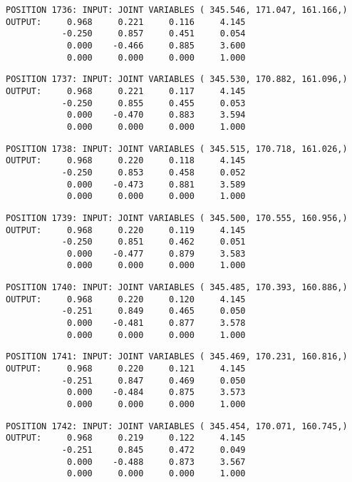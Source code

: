 \begin{verbatim}
POSITION 1736: INPUT: JOINT VARIABLES ( 345.546, 171.047, 161.166,)
OUTPUT:     0.968     0.221     0.116     4.145
           -0.250     0.857     0.451     0.054
            0.000    -0.466     0.885     3.600
            0.000     0.000     0.000     1.000
\end{verbatim} \pagebreak[1]\begin{verbatim}
POSITION 1737: INPUT: JOINT VARIABLES ( 345.530, 170.882, 161.096,)
OUTPUT:     0.968     0.221     0.117     4.145
           -0.250     0.855     0.455     0.053
            0.000    -0.470     0.883     3.594
            0.000     0.000     0.000     1.000
\end{verbatim} \pagebreak[1]\begin{verbatim}
POSITION 1738: INPUT: JOINT VARIABLES ( 345.515, 170.718, 161.026,)
OUTPUT:     0.968     0.220     0.118     4.145
           -0.250     0.853     0.458     0.052
            0.000    -0.473     0.881     3.589
            0.000     0.000     0.000     1.000
\end{verbatim} \pagebreak[1]\begin{verbatim}
POSITION 1739: INPUT: JOINT VARIABLES ( 345.500, 170.555, 160.956,)
OUTPUT:     0.968     0.220     0.119     4.145
           -0.250     0.851     0.462     0.051
            0.000    -0.477     0.879     3.583
            0.000     0.000     0.000     1.000
\end{verbatim} \pagebreak[1]\begin{verbatim}
POSITION 1740: INPUT: JOINT VARIABLES ( 345.485, 170.393, 160.886,)
OUTPUT:     0.968     0.220     0.120     4.145
           -0.251     0.849     0.465     0.050
            0.000    -0.481     0.877     3.578
            0.000     0.000     0.000     1.000
\end{verbatim} \pagebreak[1]\begin{verbatim}
POSITION 1741: INPUT: JOINT VARIABLES ( 345.469, 170.231, 160.816,)
OUTPUT:     0.968     0.220     0.121     4.145
           -0.251     0.847     0.469     0.050
            0.000    -0.484     0.875     3.573
            0.000     0.000     0.000     1.000
\end{verbatim} \pagebreak[1]\begin{verbatim}
POSITION 1742: INPUT: JOINT VARIABLES ( 345.454, 170.071, 160.745,)
OUTPUT:     0.968     0.219     0.122     4.145
           -0.251     0.845     0.472     0.049
            0.000    -0.488     0.873     3.567
            0.000     0.000     0.000     1.000
\end{verbatim} \pagebreak[1]\begin{verbatim}

\end{verbatim}
